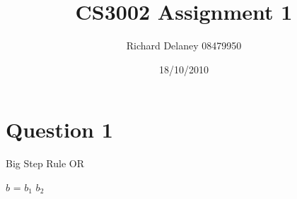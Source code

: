 \documentclass{article}
\title{CS3002 Assignment 1}
\author{Richard Delaney 08479950}
\date{18/10/2010}
\begin{document}
 \maketitle
 
\section{Question 1}

Big Step Rule OR


$b$ = $b_1$ \or $b_2$
\end{document}
